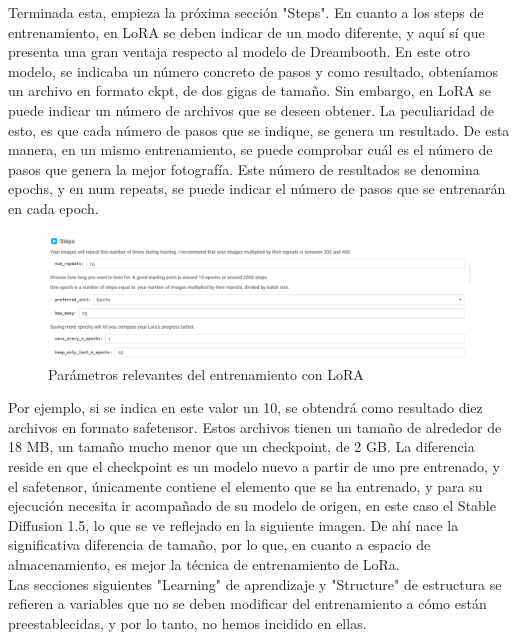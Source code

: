 Terminada esta, empieza la próxima sección "Steps".
En cuanto a los steps de entrenamiento, en LoRA se deben indicar de un modo diferente, y aquí sí que presenta una gran ventaja respecto al modelo de Dreambooth. En este otro modelo, se indicaba un número concreto de pasos y como resultado, obteníamos un archivo en formato ckpt, de dos gigas de tamaño. Sin embargo, en LoRA se puede indicar un número de archivos que se deseen obtener. La peculiaridad de esto, es que cada número de pasos que se indique, se genera un resultado. De esta manera, en un mismo entrenamiento, se puede comprobar cuál es el número de pasos que genera la mejor fotografía. Este número de resultados se denomina epochs, y en num repeats, se puede indicar el número de pasos que se entrenarán en cada epoch. \\

\begin{figure}[h]
	\centering
	\includegraphics[width = 1.2
	\textwidth]{Imagenes/Vectorial/lora.png}
	\caption{Parámetros relevantes del entrenamiento con LoRA}
	\label{fig:lora}
\end{figure}

Por ejemplo, si se indica en este valor un 10, se obtendrá como resultado diez archivos en formato safetensor. Estos archivos tienen un tamaño de alrededor de 18 MB, un tamaño mucho menor que un checkpoint, de 2 GB. La diferencia reside en que el checkpoint es un modelo nuevo a partir de uno pre entrenado, y el safetensor, únicamente contiene el elemento que se ha entrenado, y para su ejecución necesita ir acompañado de su modelo de origen, en este caso el Stable Diffusion 1.5, lo que se ve reflejado en la siguiente imagen. De ahí nace la significativa diferencia de tamaño, por lo que, en cuanto a espacio de almacenamiento, es mejor la técnica de entrenamiento de LoRa. \\


Las secciones siguientes "Learning" de aprendizaje y "Structure" de estructura se refieren a variables que no se deben modificar del entrenamiento a cómo están preestablecidas, y por lo tanto, no hemos incidido en ellas.

